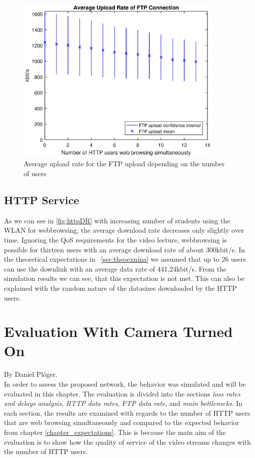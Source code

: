 \documentclass[a4paper,10pt]{book}\usepackage{graphicx}
\begin{document}
\begin{figure}[!ht]
  \begin{center}
    \includegraphics[width=0.9\textwidth]{off_ftp_upload.eps}
    \caption{Average upload rate for the FTP upload depending on the number of users}
    \label{fig:ftpUpR}
  \end{center}
\end{figure}

\section{HTTP Service}
As we can see in \ref{fig:httpDR} with increasing number of students using the WLAN for webbrowsing, the average download rate decreases only slightly over time. 
Ignoring the QoS requirements for the video lecture, webbrowsing is possible for thirteen users with an average download rate of about 300kbit/s.
In the theoretical expectations in ~\ref{sec:theoexnina} we assumed that up to 26 users can use the downlink with an average data rate of 441,24kbit/s. From the simulation results we can see,
that this expectation is not met. This can also be explained with the random nature of the datasizes downloaded by the HTTP users.
\chapter{Evaluation With Camera Turned On}
By Daniel Plöger.\\

In order to assess the proposed network, the behavior was simulated and will be evaluated in this chapter. The evaluation is divided into the sections \textit{loss rates and delays analysis}, \textit{HTTP data rates}, \textit{FTP data rate}, and \textit{main bottlenecks}. In each section, the results are examined with regards to the number of HTTP users that are web browsing simultaneously and compared to the expected behavior from chapter \ref{chapter_expectations}. This is because the main aim of the evaluation is to show how the quality of service of the video streams changes with the number of HTTP users. 
\end{document}
